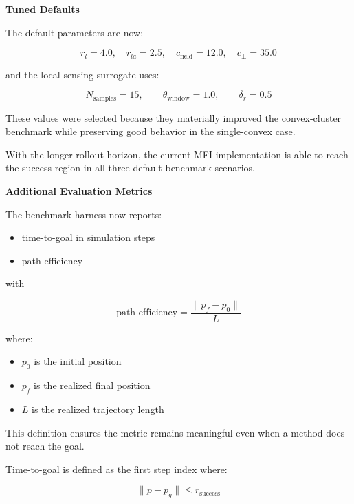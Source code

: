\documentclass[11pt]{article}
\begin{document}
\textbf{Tuned Defaults}

The default parameters are now:

\begin{equation}
r_l = 4.0, \quad r_{la} = 2.5, \quad c_{\text{field}} = 12.0, \quad c_{\perp} = 35.0
\end{equation}

and the local sensing surrogate uses:

\begin{equation}
N_{\text{samples}} = 15, \qquad \theta_{\text{window}} = 1.0, \qquad \delta_r = 0.5
\end{equation}

These values were selected because they materially improved the convex-cluster
benchmark while preserving good behavior in the single-convex case.

With the longer rollout horizon, the current MFI implementation is able to
reach the success region in all three default benchmark scenarios.

\textbf{Additional Evaluation Metrics}

The benchmark harness now reports:

\begin{itemize}[leftmargin=*]
  \item time-to-goal in simulation steps
  \item path efficiency
\end{itemize}

with

\begin{equation}
\text{path efficiency}
=
\frac{\lVert p_f - p_0 \rVert}{L}
\end{equation}

where:

\begin{itemize}[leftmargin=*]
  \item $p_0$ is the initial position
  \item $p_f$ is the realized final position
  \item $L$ is the realized trajectory length
\end{itemize}

This definition ensures the metric remains meaningful even when a method does
not reach the goal.

Time-to-goal is defined as the first step index where:

\begin{equation}
\lVert p - p_g \rVert \le r_{\text{success}}
\end{equation}
\end{document}
